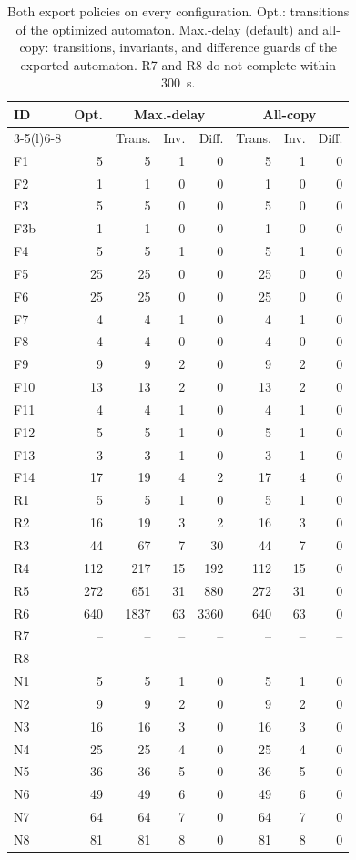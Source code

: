 \begin{table}[t]
\centering
\caption{Both export policies on every configuration. Opt.: transitions of the optimized automaton. Max.-delay (default) and all-copy: transitions, invariants, and difference guards of the exported automaton. R7 and R8 do not complete within 300~s.}
\label{tab:export-policies}
\scriptsize\setlength{\tabcolsep}{4pt}
\begin{tabular}{@{}lrrrrrrr@{}}
\toprule
ID & Opt. & \multicolumn{3}{c}{Max.-delay} & \multicolumn{3}{c}{All-copy}\\
\cmidrule(lr){3-5}\cmidrule(l){6-8}
& & Trans. & Inv. & Diff. & Trans. & Inv. & Diff.\\
\midrule
F1 & 5 & 5 & 1 & 0 & 5 & 1 & 0\\
F2 & 1 & 1 & 0 & 0 & 1 & 0 & 0\\
F3 & 5 & 5 & 0 & 0 & 5 & 0 & 0\\
F3b & 1 & 1 & 0 & 0 & 1 & 0 & 0\\
F4 & 5 & 5 & 1 & 0 & 5 & 1 & 0\\
F5 & 25 & 25 & 0 & 0 & 25 & 0 & 0\\
F6 & 25 & 25 & 0 & 0 & 25 & 0 & 0\\
F7 & 4 & 4 & 1 & 0 & 4 & 1 & 0\\
F8 & 4 & 4 & 0 & 0 & 4 & 0 & 0\\
F9 & 9 & 9 & 2 & 0 & 9 & 2 & 0\\
F10 & 13 & 13 & 2 & 0 & 13 & 2 & 0\\
F11 & 4 & 4 & 1 & 0 & 4 & 1 & 0\\
F12 & 5 & 5 & 1 & 0 & 5 & 1 & 0\\
F13 & 3 & 3 & 1 & 0 & 3 & 1 & 0\\
F14 & 17 & 19 & 4 & 2 & 17 & 4 & 0\\
R1 & 5 & 5 & 1 & 0 & 5 & 1 & 0\\
R2 & 16 & 19 & 3 & 2 & 16 & 3 & 0\\
R3 & 44 & 67 & 7 & 30 & 44 & 7 & 0\\
R4 & 112 & 217 & 15 & 192 & 112 & 15 & 0\\
R5 & 272 & 651 & 31 & 880 & 272 & 31 & 0\\
R6 & 640 & 1837 & 63 & 3360 & 640 & 63 & 0\\
R7 & -- & -- & -- & -- & -- & -- & --\\
R8 & -- & -- & -- & -- & -- & -- & --\\
N1 & 5 & 5 & 1 & 0 & 5 & 1 & 0\\
N2 & 9 & 9 & 2 & 0 & 9 & 2 & 0\\
N3 & 16 & 16 & 3 & 0 & 16 & 3 & 0\\
N4 & 25 & 25 & 4 & 0 & 25 & 4 & 0\\
N5 & 36 & 36 & 5 & 0 & 36 & 5 & 0\\
N6 & 49 & 49 & 6 & 0 & 49 & 6 & 0\\
N7 & 64 & 64 & 7 & 0 & 64 & 7 & 0\\
N8 & 81 & 81 & 8 & 0 & 81 & 8 & 0\\
\bottomrule
\end{tabular}
\end{table}
